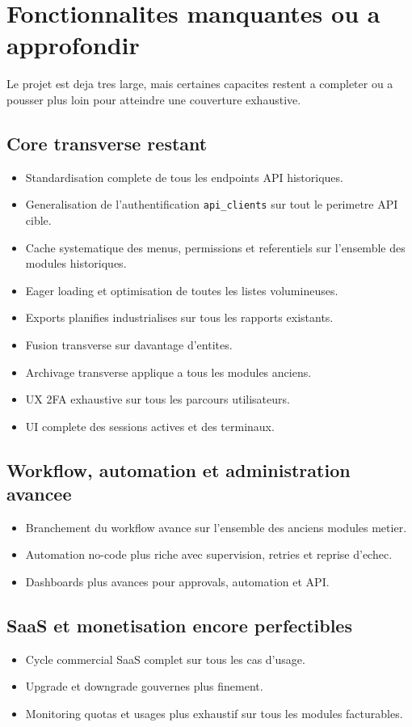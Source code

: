 \documentclass[11pt,a4paper]{article}
\begin{document}
\section{Fonctionnalites manquantes ou a approfondir}
Le projet est deja tres large, mais certaines capacites restent a completer ou a pousser plus loin pour atteindre une couverture exhaustive.

\subsection{Core transverse restant}
\begin{itemize}[leftmargin=1.2cm]
    \item Standardisation complete de tous les endpoints API historiques.
    \item Generalisation de l'authentification \texttt{api\_clients} sur tout le perimetre API cible.
    \item Cache systematique des menus, permissions et referentiels sur l'ensemble des modules historiques.
    \item Eager loading et optimisation de toutes les listes volumineuses.
    \item Exports planifies industrialises sur tous les rapports existants.
    \item Fusion transverse sur davantage d'entites.
    \item Archivage transverse applique a tous les modules anciens.
    \item UX 2FA exhaustive sur tous les parcours utilisateurs.
    \item UI complete des sessions actives et des terminaux.
\end{itemize}

\subsection{Workflow, automation et administration avancee}
\begin{itemize}[leftmargin=1.2cm]
    \item Branchement du workflow avance sur l'ensemble des anciens modules metier.
    \item Automation no-code plus riche avec supervision, retries et reprise d'echec.
    \item Dashboards plus avances pour approvals, automation et API.
\end{itemize}

\subsection{SaaS et monetisation encore perfectibles}
\begin{itemize}[leftmargin=1.2cm]
    \item Cycle commercial SaaS complet sur tous les cas d'usage.
    \item Upgrade et downgrade gouvernes plus finement.
    \item Monitoring quotas et usages plus exhaustif sur tous les modules facturables.
\end{itemize}
\end{document}
